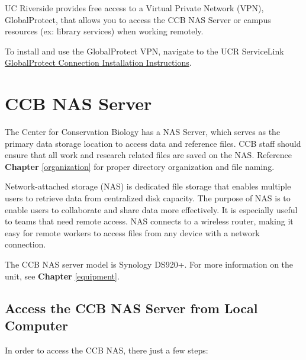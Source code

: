 \documentclass[
]{book}
\begin{document}
UC Riverside provides free access to a Virtual Private Network (VPN), GlobalProtect, that allows you to access the CCB NAS Server or campus resources (ex: library services) when working remotely.

To install and use the GlobalProtect VPN, navigate to the UCR ServiceLink \href{https://ucrsupport.service-now.com/ucr_portal/?id=kb_article\&sys_id=8a264d791b5f0c149c0b844fdd4bcb34}{GlobalProtect Connection Installation Instructions}.

\hypertarget{ccb-nas-server}{%
\section{CCB NAS Server}\label{ccb-nas-server}}

The Center for Conservation Biology has a NAS Server, which serves as the primary data storage location to access data and reference files. CCB staff should ensure that all work and research related files are saved on the NAS. Reference \textbf{Chapter} \ref{organization} for proper directory organization and file naming.

Network-attached storage (NAS) is dedicated file storage that enables multiple users to retrieve data from centralized disk capacity. The purpose of NAS is to enable users to collaborate and share data more effectively. It is especially useful to teams that need remote access. NAS connects to a wireless router, making it easy for remote workers to access files from any device with a network connection.

The CCB NAS server model is Synology DS920+. For more information on the unit, see \textbf{Chapter} \ref{equipment}.

\hypertarget{access-the-ccb-nas-server-from-local-computer}{%
\subsection{Access the CCB NAS Server from Local Computer}\label{access-the-ccb-nas-server-from-local-computer}}

In order to access the CCB NAS, there just a few steps:
\end{document}
